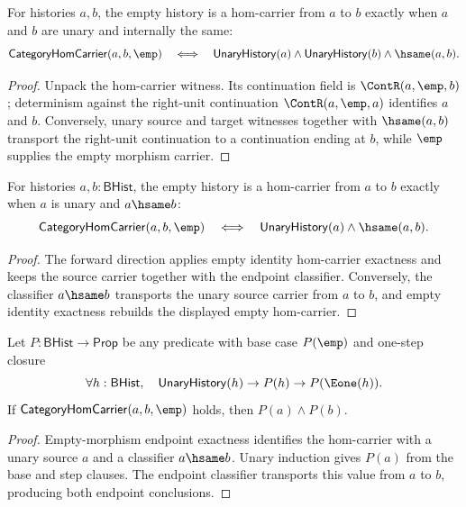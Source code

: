 \begin{theorem}
\label{thm:category-hom-carrier-empty-identity-iff}
For histories \(a,b\), the empty history is a hom-carrier from \(a\) to \(b\)
exactly when \(a\) and \(b\) are unary and internally the same:
$$
\mathsf{CategoryHomCarrier}(a,b,\emp)
\quad\Longleftrightarrow\quad
\mathsf{UnaryHistory}(a)\wedge \mathsf{UnaryHistory}(b)\wedge \hsame(a,b).
$$
\end{theorem}
\begin{proof}
Unpack the hom-carrier witness. Its continuation field is
\(\ContR(a,\emp,b)\); determinism against the right-unit continuation
\(\ContR(a,\emp,a)\) identifies \(a\) and \(b\). Conversely, unary source and
target witnesses together with \(\hsame(a,b)\) transport the right-unit
continuation to a continuation ending at \(b\), while \(\emp\) supplies the
empty morphism carrier.
\end{proof}

\begin{theorem}
\label{thm:category-hom-carrier-empty-morphism-endpoint-iff}
For histories $a,b:\mathsf{BHist}$, the empty history is a hom-carrier from
$a$ to $b$ exactly when $a$ is unary and $a\hsame b$:
$$
\mathsf{CategoryHomCarrier}(a,b,\emp)
\quad\Longleftrightarrow\quad
\mathsf{UnaryHistory}(a)\wedge \hsame(a,b).
$$
\end{theorem}
\begin{proof}
The forward direction applies empty identity hom-carrier exactness and keeps
the source carrier together with the endpoint classifier. Conversely, the
classifier $a\hsame b$ transports the unary source carrier from $a$ to $b$,
and empty identity exactness rebuilds the displayed empty hom-carrier.
\end{proof}

\begin{theorem}
\label{thm:category-hom-carrier-empty-morphism-endpoint-induction}
Let $P:\mathsf{BHist}\to\mathsf{Prop}$ be any predicate with base case
$P(\emp)$ and one-step closure
$$
\forall h:\mathsf{BHist},\quad
\mathsf{UnaryHistory}(h)\to P(h)\to P(\Eone(h)).
$$
If $\mathsf{CategoryHomCarrier}(a,b,\emp)$ holds, then $P(a)\wedge P(b)$.
\end{theorem}
\begin{proof}
Empty-morphism endpoint exactness identifies the hom-carrier with a unary
source $a$ and a classifier $a\hsame b$. Unary induction gives $P(a)$ from the
base and step clauses. The endpoint classifier transports this value from
$a$ to $b$, producing both endpoint conclusions.
\end{proof}

